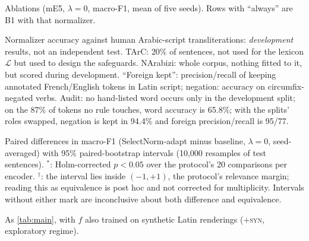 \begin{table}[!htb]
\centering\footnotesize\setlength{\tabcolsep}{3pt}

\caption{Ablations (mE5, $\lambda=0$, macro-F1, mean of five seeds). Rows with ``always'' are B1 with that normalizer.}
\label{tab:ablation}
\end{table}
\begin{table}[!htb]
\centering\footnotesize\setlength{\tabcolsep}{2.5pt}
\resizebox{\columnwidth}{!}{}
\caption{Normalizer accuracy against human Arabic-script transliterations: \emph{development} results, not an independent test. TArC: 20\% of sentences, not used for the lexicon $\mathcal L$ but used to design the safeguards. NArabizi: whole corpus, nothing fitted to it, but scored during development. ``Foreign kept'': precision/recall of keeping annotated French/English tokens in Latin script; negation: accuracy on circumfix-negated verbs. Audit: no hand-listed word occurs only in the development split; on the 87\% of tokens no rule touches, word accuracy is 65.8\%; with the splits' roles swapped, negation is kept in 94.4\% and foreign precision/recall is 95/77.}
\label{tab:intrinsic}
\end{table}
\begin{table}[t]
\centering\scriptsize\setlength{\tabcolsep}{3pt}

\caption{Paired differences in macro-F1 (SelectNorm-adapt minus baseline, $\lambda=0$, seed-averaged) with 95\% paired-bootstrap intervals (10{,}000 resamples of test sentences). $^{*}$: Holm-corrected $p<0.05$ over the protocol's 20 comparisons per encoder. $^{\dagger}$: the interval lies inside $(-1,+1)$, the protocol's relevance margin; reading this as equivalence is post hoc and not corrected for multiplicity. Intervals without either mark are inconclusive about both difference and equivalence.}
\label{tab:paired}
\vspace{2mm}
\centering\scriptsize\setlength{\tabcolsep}{3.5pt}

\caption{As \cref{tab:main}, with $f$ also trained on synthetic Latin renderings (\textsc{+syn}, exploratory regime).}
\label{tab:main-syn}
\end{table}
